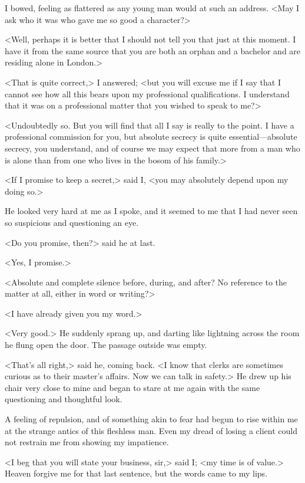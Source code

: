 I bowed, feeling as flattered as any young man would at such an address. <May I ask who it was who gave me so good a character?>

<Well, perhaps it is better that I should not tell you that just at this moment. I have it from the same source that you are both an orphan and a bachelor and are residing alone in London.>

<That is quite correct,> I answered; <but you will excuse me if I say that I cannot see how all this bears upon my professional qualifications. I understand that it was on a professional matter that you wished to speak to me?>

<Undoubtedly so. But you will find that all I say is really to the point. I have a professional commission for you, but absolute secrecy is quite essential—absolute secrecy, you understand, and of course we may expect that more from a man who is alone than from one who lives in the bosom of his family.>

<If I promise to keep a secret,> said I, <you may absolutely depend upon my doing so.>

He looked very hard at me as I spoke, and it seemed to me that I had never seen so suspicious and questioning an eye.

<Do you promise, then?> said he at last.

<Yes, I promise.>

<Absolute and complete silence before, during, and after? No reference to the matter at all, either in word or writing?>

<I have already given you my word.>

<Very good.> He suddenly sprang up, and darting like lightning across the room he flung open the door. The passage outside was empty.

<That's all right,> said he, coming back. <I know that clerks are sometimes curious as to their master's affairs. Now we can talk in safety.> He drew up his chair very close to mine and began to stare at me again with the same questioning and thoughtful look.

A feeling of repulsion, and of something akin to fear had begun to rise within me at the strange antics of this fleshless man. Even my dread of losing a client could not restrain me from showing my impatience.

<I beg that you will state your business, sir,> said I; <my time is of value.> Heaven forgive me for that last sentence, but the words came to my lips.

